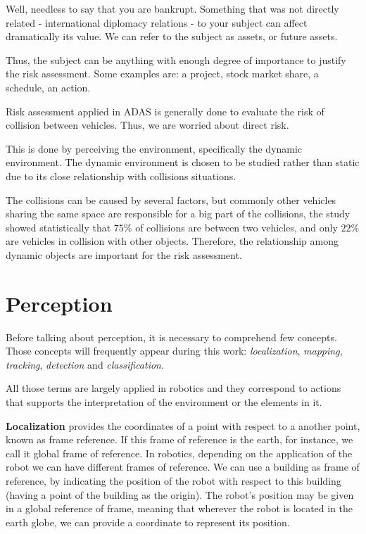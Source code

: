 Well, needless to say that you are bankrupt. Something that was not directly related - international diplomacy relations - to your subject can affect dramatically its value. We can refer to the subject as assets, or future assets.

Thus, the subject can be anything with enough degree of importance to justify the risk assessment. Some examples are: a project, stock market share, a schedule, an action.

Risk assessment applied in ADAS is generally done to evaluate the risk of collision between vehicles. Thus, we are worried about direct risk. 

This is done by perceiving the environment, specifically the dynamic environment. The dynamic environment is chosen to be studied rather than static due to its close relationship with  collisions situations. 

The collisions can be caused by several factors, but commonly other vehicles sharing the same space are responsible for a big part of the collisions, the study \cite{Hurt_1981} showed statistically that $75\%$ of collisions are between two vehicles, and only $22\%$ are vehicles in collision with other objects. Therefore, the relationship among dynamic objects are important for the risk assessment.

\section{Perception}

Before talking about perception, it is necessary to comprehend few concepts. Those concepts will frequently appear during this work: \textit{localization}, \textit{mapping}, \textit{tracking}, \textit{detection} and \textit{classification}.

All those terms are largely applied in robotics and they correspond to actions that supports the interpretation of  the environment or the elements in it.

\textbf{Localization} provides the coordinates of a point with respect to a another point, known as frame reference. If this frame of reference is the earth, for instance, we call it global frame of reference. In robotics, depending on the application of the robot we can have different frames of reference. We can use a building as frame of reference, by indicating the position of the robot with respect to this building (having a point of the building as the origin). The robot's position may be given in a global reference of frame, meaning that wherever the robot is located in the earth globe, we can provide a coordinate to represent its position. 

